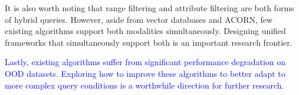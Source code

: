 \documentclass[sigconf, nonacm]{acmart}
\begin{document}
{	
	It is also worth noting that range filtering and attribute filtering are both forms of hybrid queries. However, aside from vector databases and ACORN, few existing algorithms support both modalities simultaneously. Designing unified frameworks that simultaneously support both is an important research frontier. 
	
	\textcolor{blue}{
	Lastly, existing algorithms suffer from significant performance degradation on OOD datasets. Exploring how to improve these algorithms to better adapt to more complex query conditions is a worthwhile direction for further research.}
	
%	
	
}
\end{document}
